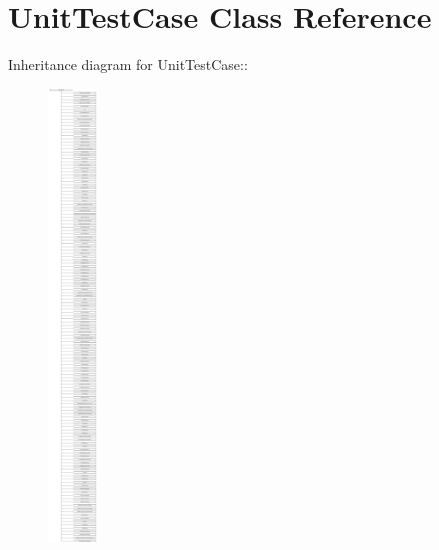 \hypertarget{class_unit_test_case}{
\section{UnitTestCase Class Reference}
\label{class_unit_test_case}
}
Inheritance diagram for UnitTestCase::\begin{figure}[H]
\begin{center}
\leavevmode
\includegraphics[height=12cm]{class_unit_test_case}
\end{center}
\end{figure}

